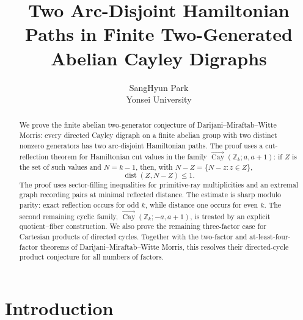 \documentclass[11pt]{article}
\title{Two Arc-Disjoint Hamiltonian Paths in Finite Two-Generated Abelian Cayley Digraphs}
\author{SangHyun Park\\Yonsei University}
\date{}
\newcommand{\Cay}{\overrightarrow{\operatorname{Cay}}}
\newcommand{\Z}{\mathbb Z}
\newcommand{\dist}{\operatorname{dist}}
\begin{document}
\maketitle

\begin{abstract}
We prove the finite abelian two-generator conjecture of Darijani--Miraftab--Witte Morris: every directed Cayley digraph on a finite abelian group with two distinct nonzero generators has two arc-disjoint Hamiltonian paths.  The proof uses a cut-reflection theorem for Hamiltonian cut values in the family $\Cay(\Z_k;a,a+1)$: if $Z$ is the set of such values and $N=k-1$, then, with $N-Z=\{N-z:z\in Z\}$,
\[
        \dist(Z,N-Z)\le1.
\]
The proof uses sector-filling inequalities for primitive-ray multiplicities and an extremal graph recording pairs at minimal reflected distance.  The estimate is sharp modulo parity: exact reflection occurs for odd $k$, while distance one occurs for even $k$.  The second remaining cyclic family, $\Cay(\Z_k;-a,a+1)$, is treated by an explicit quotient--fiber construction.  We also prove the remaining three-factor case for Cartesian products of directed cycles.  Together with the two-factor and at-least-four-factor theorems of Darijani--Miraftab--Witte Morris, this resolves their directed-cycle product conjecture for all numbers of factors.
\end{abstract}

\section{Introduction}
\end{document}
